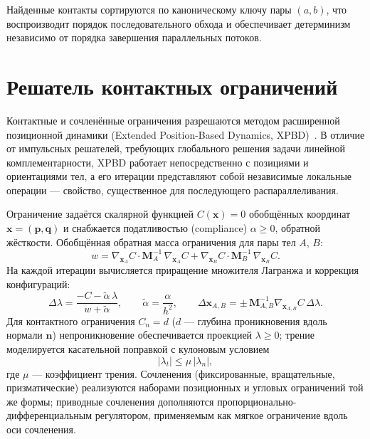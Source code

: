 Найденные контакты сортируются по каноническому ключу пары $(a, b)$, что
воспроизводит порядок последовательного обхода и обеспечивает детерминизм
независимо от порядка завершения параллельных потоков.

\section{Решатель контактных ограничений}

Контактные и сочленённые ограничения разрешаются методом расширенной
позиционной динамики (Extended Position-Based Dynamics,
XPBD)~\cite{macklin2016xpbd}. В отличие от импульсных решателей, требующих
глобального решения задачи линейной комплементарности, XPBD работает
непосредственно с позициями и ориентациями тел, а его итерации представляют
собой независимые локальные операции --- свойство, существенное для
последующего распараллеливания.

Ограничение задаётся скалярной функцией $C(\mathbf{x})=0$ обобщённых координат
$\mathbf{x} = (\mathbf{p}, \mathbf{q})$ и снабжается податливостью (compliance)
$\alpha \ge 0$, обратной жёсткости. Обобщённая обратная масса ограничения для
пары тел $A$, $B$:
\begin{equation}
  w = \nabla_{\mathbf{x}_A} C \cdot \mathbf{M}_A^{-1}\,\nabla_{\mathbf{x}_A} C +
      \nabla_{\mathbf{x}_B} C \cdot \mathbf{M}_B^{-1}\,\nabla_{\mathbf{x}_B} C.
  \label{eq:gen-inv-mass}
\end{equation}
На каждой итерации вычисляется приращение множителя Лагранжа и коррекция
конфигураций:
\begin{equation}
  \Delta\lambda =
  \frac{-C - \tilde{\alpha}\,\lambda}{w + \tilde{\alpha}},
  \qquad
  \tilde{\alpha} = \frac{\alpha}{h^2},
  \qquad
  \Delta\mathbf{x}_{A,B} = \pm\,\mathbf{M}_{A,B}^{-1}
  \nabla_{\mathbf{x}_{A,B}} C\,\Delta\lambda.
  \label{eq:xpbd}
\end{equation}
Для контактного ограничения $C_n = d$ ($d$ --- глубина проникновения вдоль
нормали $\hat{\mathbf{n}}$) непроникновение обеспечивается проекцией
$\lambda \ge 0$; трение моделируется касательной поправкой с кулоновым
условием
\begin{equation}
  |\lambda_t| \le \mu\,|\lambda_n|,
  \label{eq:coulomb}
\end{equation}
где $\mu$ --- коэффициент трения. Сочленения (фиксированные, вращательные,
призматические) реализуются наборами позиционных и угловых ограничений той же
формы; приводные сочленения дополняются пропорционально-дифференциальным
регулятором, применяемым как мягкое ограничение вдоль оси сочленения.

